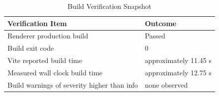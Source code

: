 \documentclass[12pt, a4paper]{report}
\begin{document}
\begin{table}[H]
  \caption{Build Verification Snapshot}
  \label{tab:4.3}
  \centering
  {\fontsize{11}{14}\selectfont
    \begin{tabular}{|p{3in}|p{2in}|}
      \hline
      \textbf{Verification Item} & \textbf{Outcome} \\
      \hline
      Renderer production build & Passed \\
      \hline
      Build exit code & 0 \\
      \hline
      Vite reported build time & approximately 11.45 s \\
      \hline
      Measured wall clock build time & approximately 12.75 s \\
      \hline
      Build warnings of severity higher than info & none observed \\
      \hline
    \end{tabular}
  }
\end{table}
\end{document}
